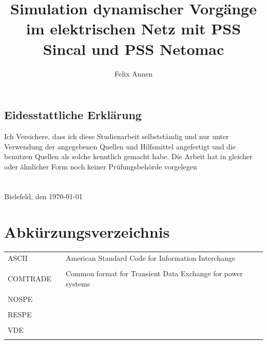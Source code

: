 \documentclass{scrartcl}
\title{Simulation dynamischer Vorgänge im elektrischen Netz mit PSS Sincal und PSS Netomac}
\author{Felix Annen}
\begin{document}
\begin{titlepage}



\maketitle
\thispagestyle{empty}
\newpage
	\subsection*{Eidesstattliche Erklärung}
	\glqq Ich Versichere, dass ich diese Studienarbeit selbstständig und nur unter Verwendung der angegebenen Quellen und Hilfsmittel angefertigt und die benutzen Quellen als solche kenntlich gemacht habe. Die Arbeit hat in gleicher oder ähnlicher Form noch keiner Prüfungsbehörde vorgelegen\grqq \\ \\ \\
	Bielefeld, den \today


\end{titlepage}


	\setcounter{page}{1}
	\tableofcontents
	\newpage
	\listoffigures
	\listoftables
	
	\newpage
	\section*{Abkürzungsverzeichnis}
	\begin{tabular}{lll}
	ASCII & & American Standard Code for Information Interchange \\ \\
	COMTRADE & & Common format for Transient Data Exchange for power systems \\ \\
	NOSPE & & \\ \\
	RESPE & & \\ \\
	VDE & & \\ \\
	
	\end{tabular}
	
\end{document}
